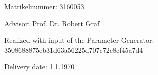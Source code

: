 \begin{large} 
\begin{center}
Matrikelnummer: 3160053
\end{center}
\end{large} 

\vspace*{-0mm}




\begin{large} 
\begin{center}
Advisor: Prof. Dr. Robert Graf
\end{center}
\end{large} 

\begin{large} 
\begin{center}
Realized with input of the Parameter Generator: \\3508688875eb31d63a56225d707c72c8cf45a7d4 
\end{center}
\end{large} 





\vspace*{-6mm}

\begin{large} 
\begin{center}
Delivery date: 1.1.1970
\end{center}
\end{large} 


\pagestyle{empty} %